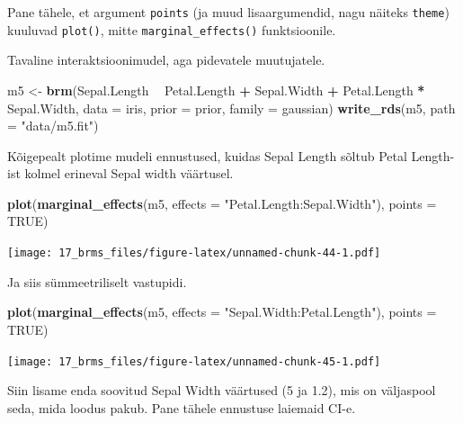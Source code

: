 \documentclass[]{book}
\newenvironment{Shaded}{\begin{snugshade}}{\end{snugshade}}
\newcommand{\DataTypeTok}[1]{\textcolor[rgb]{0.13,0.29,0.53}{#1}}
\newcommand{\KeywordTok}[1]{\textcolor[rgb]{0.13,0.29,0.53}{\textbf{#1}}}
\newcommand{\NormalTok}[1]{#1}
\newcommand{\OperatorTok}[1]{\textcolor[rgb]{0.81,0.36,0.00}{\textbf{#1}}}
\newcommand{\OtherTok}[1]{\textcolor[rgb]{0.56,0.35,0.01}{#1}}
\newcommand{\StringTok}[1]{\textcolor[rgb]{0.31,0.60,0.02}{#1}}
\begin{document}
Pane tähele, et argument \texttt{points} (ja muud lisaargumendid, nagu näiteks \texttt{theme}) kuuluvad \texttt{plot()}, mitte \texttt{marginal\_effects()} funktsioonile.

Tavaline interaktsioonimudel, aga pidevatele muutujatele.

\begin{Shaded}
\begin{Highlighting}[]
\NormalTok{m5 <-}\StringTok{ }\KeywordTok{brm}\NormalTok{(Sepal.Length }\OperatorTok{~}\StringTok{ }\NormalTok{Petal.Length }\OperatorTok{+}\StringTok{ }\NormalTok{Sepal.Width }\OperatorTok{+}\StringTok{ }\NormalTok{Petal.Length }\OperatorTok{*}\StringTok{ }\NormalTok{Sepal.Width, }
          \DataTypeTok{data =}\NormalTok{ iris, }
          \DataTypeTok{prior =}\NormalTok{ prior, }
          \DataTypeTok{family =}\NormalTok{ gaussian)}
\KeywordTok{write_rds}\NormalTok{(m5, }\DataTypeTok{path =} \StringTok{"data/m5.fit"}\NormalTok{)}
\end{Highlighting}
\end{Shaded}

Kõigepealt plotime mudeli ennustused, kuidas Sepal Length sõltub Petal Length-ist kolmel erineval Sepal width väärtusel.

\begin{Shaded}
\begin{Highlighting}[]
\KeywordTok{plot}\NormalTok{(}\KeywordTok{marginal_effects}\NormalTok{(m5, }\DataTypeTok{effects =} \StringTok{"Petal.Length:Sepal.Width"}\NormalTok{), }\DataTypeTok{points =} \OtherTok{TRUE}\NormalTok{)}
\end{Highlighting}
\end{Shaded}

\texttt{[image: 17\_brms\_files/figure-latex/unnamed-chunk-44-1.pdf]}

Ja siis sümmeetriliselt vastupidi.

\begin{Shaded}
\begin{Highlighting}[]
\KeywordTok{plot}\NormalTok{(}\KeywordTok{marginal_effects}\NormalTok{(m5, }\DataTypeTok{effects =} \StringTok{"Sepal.Width:Petal.Length"}\NormalTok{), }\DataTypeTok{points =} \OtherTok{TRUE}\NormalTok{)}
\end{Highlighting}
\end{Shaded}

\texttt{[image: 17\_brms\_files/figure-latex/unnamed-chunk-45-1.pdf]}

Siin lisame enda soovitud Sepal Width väärtused (5 ja 1.2), mis on väljaspool seda, mida loodus pakub. Pane tähele ennustuse laiemaid CI-e.
\end{document}
